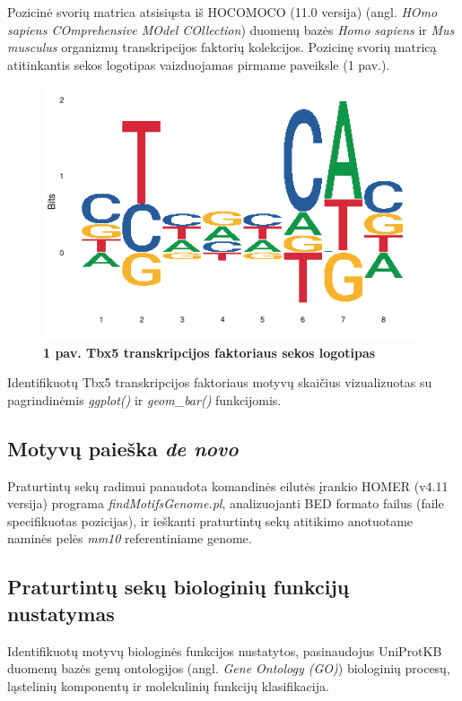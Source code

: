 \documentclass[12pt]{article}
\begin{document}
Pozicinė svorių matrica atsisiųsta iš HOCOMOCO\cite{HOCOMOCO} (11.0 versija)
(angl. \emph{HOmo sapiens COmprehensive MOdel COllection}) duomenų bazės
\emph{Homo sapiens} ir \emph{Mus musculus} organizmų transkripcijos faktorių
kolekcijos. Pozicinę svorių matricą atitinkantis sekos logotipas vaizduojamas
pirmame paveiksle (1 pav.).

\begin{figure}[htb]
    \begin{center}
        \includegraphics[width=0.4\linewidth]{../Figures/tbx5_motif.png}
        \vspace{-2\baselineskip}
        \caption*{\small\textbf{1 pav. Tbx5 transkripcijos faktoriaus
                                sekos logotipas}}
        \label{fig:birds}
    \end{center}
\end{figure}

Identifikuotų Tbx5 transkripcijos faktoriaus motyvų skaičius vizualizuotas su
pagrindinėmis \emph{ggplot()} ir \emph{geom\_bar()} funkcijomis.

\subsection{Motyvų paieška \emph{de novo}}
Praturtintų sekų radimui panaudota komandinės eilutės įrankio HOMER\cite{HOMER}
(v4.11 versija) programa \emph{findMotifsGenome.pl}, analizuojanti BED formato
failus (faile specifikuotas pozicijas), ir ieškanti praturtintų sekų atitikimo
anotuotame naminės pelės \emph{mm10} referentiniame genome.

\subsection{Praturtintų sekų biologinių funkcijų nustatymas}
Identifikuotų motyvų biologinės funkcijos nustatytos, pasinaudojus
UniProtKB\cite{UNIPROT} duomenų bazės genų ontologijos (angl. \emph{Gene
Ontology (GO)}) biologinių procesų, ląstelinių komponentų ir molekulinių
funkcijų klasifikacija.
\end{document}
